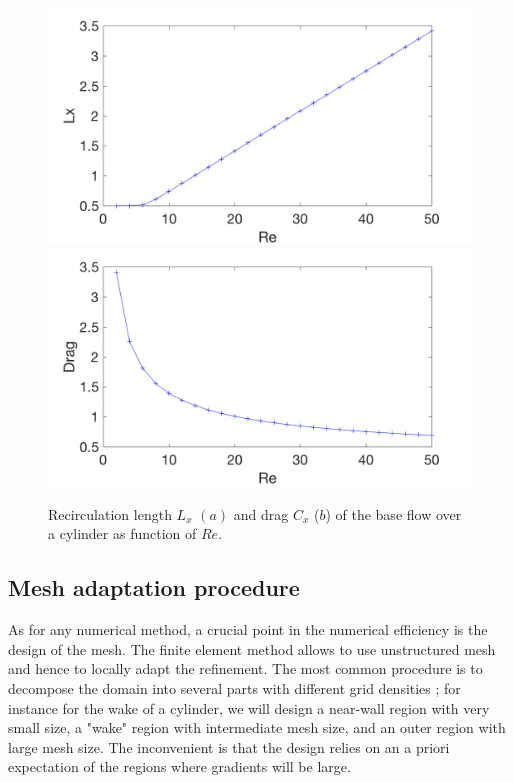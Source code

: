 \documentclass[twocolumn,10pt]{asme2ej}
\begin{document}
\begin{figure}
\includegraphics[width=.9 \linewidth]{Cylinder_Lx_baseflow.png}
\includegraphics[width=.9 \linewidth]{Cylinder_Drag_baseflow.png}
\caption{Recirculation length $L_x$ $(a)$  and drag $C_x$ ($b$) of the base flow over a cylinder as function of $Re$.}
\label{fig:LxandDrag}
\end{figure}




\subsection{Mesh adaptation procedure}
\vspace{.2cm}

As for any numerical method, a crucial point in the numerical efficiency is the design of the mesh. The finite element method allows to use unstructured mesh and hence to locally adapt the refinement. %
The most common procedure is to decompose the domain into several parts with different grid densities ; for instance for the wake of a cylinder, we will design a near-wall region with very small  size, a "wake" region with intermediate mesh size, and an outer region with large mesh size. The inconvenient is that the design relies on an a priori expectation of the regions where gradients will be large. 
\end{document}
